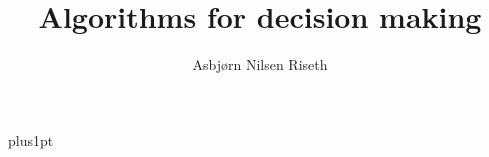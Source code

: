 \documentclass[12pt,fleqn]{ociamthesis}
\title{Algorithms for decision making}
\author{Asbj{\o}rn Nilsen Riseth}
\def\biblio{}
\def\chtodolist{\listoftodos}
\begin{document}
\def\biblio{} %
\def\chtodolist{}

\baselineskip=18pt plus1pt

\setcounter{secnumdepth}{3}
\setcounter{tocdepth}{3}


\maketitle                  %
\begin{dedication}
\end{dedication}

\begin{acknowledgements}
\end{acknowledgements}

\begin{abstract}
\end{abstract}

\begin{originality}
  
\end{originality}

\begin{romanpages}          %
  \listoftodos
  \tableofcontents            %
  \listoffigures              %
  \listoftables               %
\end{romanpages}            %












\appendix



\end{document}
